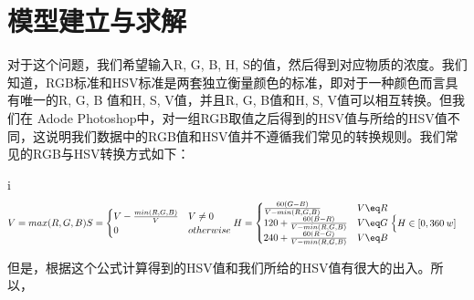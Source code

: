 \section{模型建立与求解}
对于这个问题，我们希望输入R, G, B, H, S的值，然后得到对应物质的浓度。我们知道，RGB标准和HSV标准是两套独立衡量颜色的标准，即对于一种颜色而言具有唯一的R, G, B 值和H, S, V值，并且R, G, B值和H, S, V值可以相互转换。但我们在 Adode Photoshop中，对一组RGB取值之后得到的HSV值与所给的HSV值不同，这说明我们数据中的RGB值和HSV值并不遵循我们常见的转换规则。我们常见的RGB与HSV转换方式如下：

i\begin{displaymath}
\begin{align}
V = max(R, G, B)

S = \begin{cases} 
V - \frac{min(R, G, B)}{V} & V \neq 0 \\
0 & otherwise
\end{cases}

H = \begin{cases}
\frac {60(G-B)} {V-min(R, G, B)} & V \eq R \\
120 + \frac{60(B-R)}{V-min(R,G,B)}  & V \eq G \\ 
240 + \frac{60(R-G)}{V-min(R,G,B)} & V \eq B
\end{cases}

\begin{cases}
H \in [0, 360\:w]
\end{cases}
\end{align}
\end{displaymath}

但是，根据这个公式计算得到的HSV值和我们所给的HSV值有很大的出入。所以，
